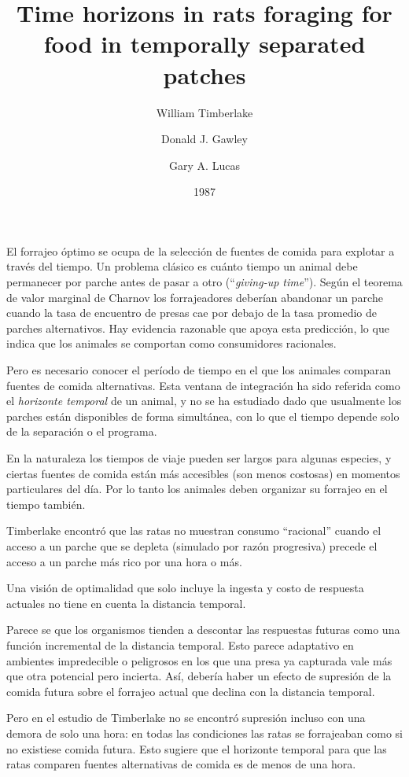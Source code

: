 \documentclass[a4paper,12pt]{article}
\title{Time horizons in rats foraging for food in temporally separated patches}
\author{William Timberlake \and Donald J. Gawley \and Gary A. Lucas}
\date{1987}
\begin{document}
{\scshape\bfseries \maketitle}

El forrajeo óptimo se ocupa de la selección de fuentes de comida para explotar a través del tiempo. Un problema clásico es cuánto tiempo un animal debe permanecer por parche antes de pasar a otro (``{\itshape giving-up time}''). Según el teorema de valor marginal de Charnov los forrajeadores deberían abandonar un parche cuando la tasa de encuentro de presas cae por debajo de la tasa promedio de parches alternativos. Hay evidencia razonable que apoya esta predicción, lo que indica que los animales se comportan como consumidores racionales.

Pero es necesario conocer el período de tiempo en el que los animales comparan fuentes de comida alternativas. Esta ventana de integración ha sido referida como el {\itshape horizonte temporal} de un animal, y no se ha estudiado dado que usualmente los parches están disponibles de forma simultánea, con lo que el tiempo depende solo de la separación o el programa.

En la naturaleza los tiempos de viaje pueden ser largos para algunas especies, y ciertas fuentes de comida están más accesibles (son menos costosas) en momentos particulares del día. Por lo tanto los animales deben organizar su forrajeo en el tiempo también.

Timberlake encontró que las ratas no muestran consumo ``racional'' cuando el acceso a un parche que se depleta (simulado por razón progresiva) precede el acceso a un parche más rico por una hora o más.

Una visión de optimalidad que solo incluye la ingesta y costo de respuesta actuales no tiene en cuenta la distancia temporal.

Parece se que los organismos tienden a descontar las respuestas futuras como una función incremental de la distancia temporal. Esto parece adaptativo en ambientes impredecible o peligrosos en los que una presa ya capturada vale más que otra potencial pero incierta. Así, debería haber un efecto de supresión de la comida futura sobre el forrajeo actual que declina con la distancia temporal.

Pero en el estudio de Timberlake no se encontró supresión incluso con una demora de solo una hora: en todas las condiciones las ratas se forrajeaban como si no existiese comida futura. Esto sugiere que el horizonte temporal para que las ratas comparen fuentes alternativas de comida es de menos de una hora.
\end{document}
